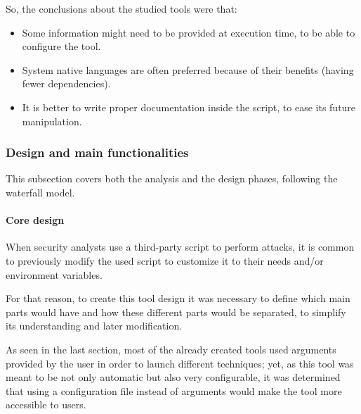 So, the conclusions about the studied tools were that:
\begin{itemize}
\item Some information might need to be provided at execution time, to be able to configure the tool.
\item System native languages are often preferred because of their benefits (having fewer dependencies).
\item It is better to write proper documentation inside the script, to ease its future manipulation.
\end{itemize}

\subsubsection{Design and main functionalities}
\label{ssec:devDesign}
This subsection covers both the analysis and the design phases,
 following the waterfall model.

\paragraph{Core design}
When security analysts use a third-party script to perform attacks, it is common to previously modify the used script to customize it to their needs and/or environment variables. 

For that reason, to create this tool design it was necessary to define which main parts would have and how these different parts would be separated, to simplify its understanding and later modification.

As seen in the last section, most of the already created tools used arguments provided by the user in order to launch different techniques; yet, as this tool was meant to be not only automatic but also very configurable, it was determined that using a configuration file instead of arguments would make the tool more accessible to users.

